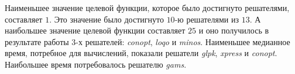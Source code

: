 Наименьшее значение целевой функции, которое было достигнуто решателями, составляет $1$. Это значение было достигнуто $10$-ю решателями из $13$. А наибольшее значение целевой функции составляет $25$ и оно получилось в результате работы $3$-х решателей: \textit{conopt}, \textit{loqo} и \textit{minos}. Наименьшее медианное время, потребное для вычислений, показали решатели \textit{glpk}, \textit{xpress} и \textit{conopt}. Наибольшее время потребовалось решателю \textit{gams}.
